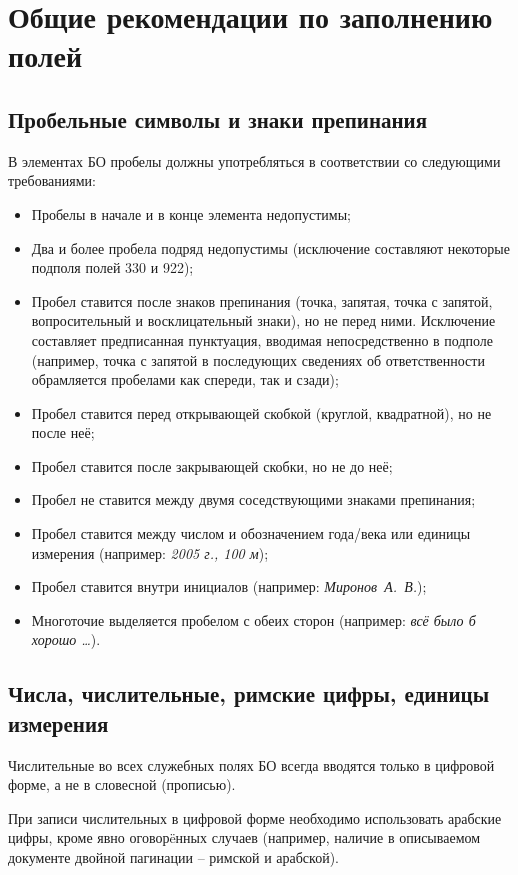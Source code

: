 \chapter{Общие рекомендации по заполнению полей}

\section{Пробельные символы и знаки препинания}

В элементах БО пробелы должны употребляться в соответствии со следующими требованиями:

\begin{itemize}
	\item Пробелы в начале и в конце элемента недопустимы;
	\item Два и более пробела подряд недопустимы (исключение составляют некоторые подполя полей 330 и 922);
	\item Пробел ставится после знаков препинания (точка, запятая, точка с запятой, вопросительный и восклицательный знаки), но не перед ними. Исключение составляет предписанная пунктуация, вводимая непосредственно в подполе (например, точка с запятой в последующих сведениях об ответственности обрамляется пробелами как спереди, так и сзади);
	\item Пробел ставится перед открывающей скобкой (круглой, квадратной), но не после неё;
	\item Пробел ставится после закрывающей скобки, но не до неё;
	\item Пробел не ставится между двумя соседствующими знаками препинания;
	\item Пробел ставится между числом и обозначением года/века или единицы измерения (например: \textit{2005 г., 100 м});
	\item Пробел ставится внутри инициалов (например: \emph{Миронов~А.~В.});
	\item Многоточие выделяется пробелом с обеих сторон (например: \emph{всё было б хорошо \dots }).
\end{itemize}

\section{Числа, числительные, римские цифры, единицы измерения}

Числительные во всех служебных полях БО всегда вводятся только в цифровой форме, а не в словесной (прописью).

При записи числительных в цифровой форме необходимо использовать арабские цифры, кроме явно оговор\"eнных случаев (например, наличие в описываемом документе двойной пагинации -- римской и арабской).

